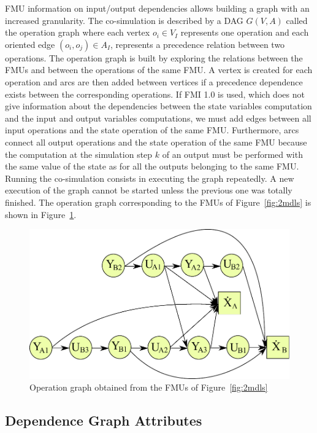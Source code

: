 FMU information on input/output dependencies allows building a graph with an increased granularity. The co-simulation is described by a DAG $G(V,A)$ called the operation graph where each vertex $o_i \in V_I$ represents one operation and each oriented edge $(o_i,o_j) \in A_I$, represents a precedence relation between two operations. The operation graph is built by exploring the relations between the FMUs and between the operations of the same FMU. A vertex is created for each operation and arcs are then added between vertices if a precedence dependence exists between the corresponding operations. If FMI 1.0 is used, which does not give information about the dependencies between the state variables computation and the input and output variables computations, we must add edges between all input operations and the state operation of the same FMU. Furthermore, arcs connect all output operations and the state operation of the same FMU because the computation at the simulation step $k$ of an output must be performed with the same value of the state as for all the outputs belonging to the same FMU. Running the co-simulation consists in executing the graph repeatedly. A new execution of the graph cannot be started unless the previous one was totally finished. The operation graph corresponding to the FMUs of Figure~\ref{fig:2mdls} is shown in Figure~\ref{fig:dag}.

\begin{figure}[htb]
\centering
  \includegraphics[scale=0.5]{figures/Operation_Graph_Two_Models}
\caption{Operation graph obtained from the FMUs of Figure~\ref{fig:2mdls}}
\label{fig:dag}
\end{figure} 

\subsection{Dependence Graph Attributes}

